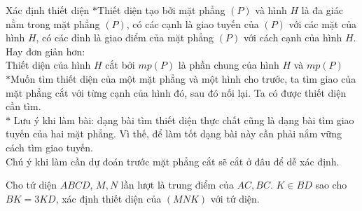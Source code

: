 	\begin{dang}{Xác định thiết diện}
		$\ast$Thiết diện tạo bởi mặt phẳng $(P)$ và hình $H$ là đa giác nằm trong mặt phẳng $(P)$, có các cạnh là giao tuyến của $(P)$ với các mặt của hình $H$, có các đỉnh là giao điểm của mặt phẳng $(P)$ với cách cạnh của hình $H$. Hay đơn giản hơn:\\         
		Thiết diện của hình $H$ cắt bởi $mp(P)$ là phần chung của hình $H$ và $mp(P)$\\    
		$\ast$Muốn tìm thiết diện của một mặt phẳng và một hình cho trước, ta tìm giao của mặt phẳng cắt với từng cạnh của hình đó, sau đó nối lại. Ta có được thiết diện cần tìm.
		\\$\ast$ Lưu ý khi làm bài: dạng bài tìm thiết diện thực chất cũng là dạng bài tìm giao tuyến của hai mặt phẳng. Vì thế, để làm tốt dạng bài này cần phải nắm vững cách tìm giao tuyến.\\Chú ý khi làm cần dự đoán trước mặt phẳng cắt sẽ cắt ở đâu để dễ xác định.
	\end{dang}
	\begin{vd}%
		Cho tứ diện $ABCD$, $M,N$ lần lượt là trung điểm của $AC, BC$. $K\in BD$ sao cho $BK=3KD$, xác định thiết diện của $(MNK)$ với tứ diện. 
	\end{vd}
